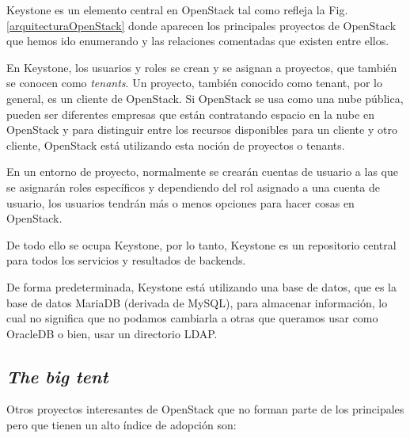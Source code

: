 Keystone es un elemento central en OpenStack tal como refleja la Fig.\ref{arquitecturaOpenStack} donde aparecen los principales proyectos de OpenStack que hemos ido enumerando y las relaciones comentadas que existen entre ellos.

En Keystone, los usuarios y roles se crean y se asignan a proyectos, que también se conocen como \textit{tenants}. Un proyecto, también conocido como tenant, por lo general, es un cliente de OpenStack. Si OpenStack se usa como una nube pública, pueden ser diferentes empresas que están contratando espacio en la nube en OpenStack y para distinguir entre los recursos disponibles para un cliente y otro cliente, OpenStack está utilizando esta noción de proyectos o tenants.

En un entorno de proyecto, normalmente se crearán cuentas de usuario a las que se asignarán roles específicos y dependiendo del rol asignado a una cuenta de usuario, los usuarios tendrán más o menos opciones para hacer cosas en OpenStack.

De todo ello se ocupa Keystone, por lo tanto, Keystone es un repositorio central para todos los servicios y resultados de backends.

De forma predeterminada, Keystone está utilizando una base de datos, que es la base de datos MariaDB (derivada de MySQL), para almacenar información, lo cual no significa que no podamos cambiarla a otras que queramos usar como OracleDB o bien, usar un directorio LDAP.

\subsection{\textit{The big tent}}
Otros proyectos interesantes de OpenStack que no forman parte de los principales pero que tienen un alto índice de adopción son:

